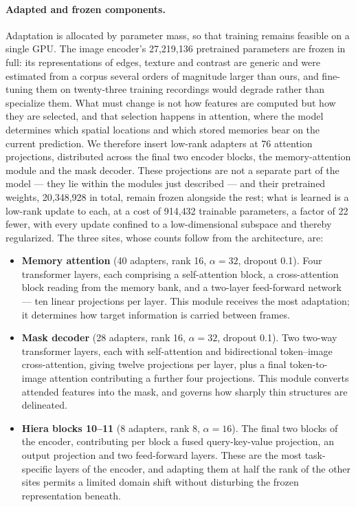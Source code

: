 \documentclass[11pt,a4paper]{article}
\begin{document}
\paragraph{Adapted and frozen components.}
Adaptation is allocated by parameter mass, so that training remains feasible
on a single GPU. The
image encoder's 27{,}219{,}136 pretrained parameters are frozen in full:
its representations of edges, texture and contrast are generic and were
estimated from a corpus several orders of magnitude larger than ours, and
fine-tuning them on twenty-three training recordings would degrade rather
than specialize them.
What must change is not how features are computed but how they are selected,
and that selection happens in attention, where the model determines which
spatial locations and which stored memories bear on the current prediction.
We therefore insert low-rank adapters at 76 attention projections,
distributed across the final two encoder blocks, the memory-attention module
and the mask decoder. These projections are not a separate part of the model
--- they lie within the modules just described --- and their pretrained
weights, 20{,}348{,}928 in total, remain frozen alongside the rest; what is
learned is a low-rank update to each, at a cost of 914{,}432 trainable
parameters, a factor of 22 fewer, with every update confined to a
low-dimensional subspace and thereby regularized. The three sites, whose
counts follow from the architecture, are:

\begin{itemize}\itemsep2pt
  \item \textbf{Memory attention} (40 adapters, rank 16, $\alpha=32$,
        dropout 0.1). Four transformer layers, each comprising a
        self-attention block, a cross-attention block reading from the
        memory bank, and a two-layer feed-forward network --- ten linear
        projections per layer. This module receives the most adaptation; it
        determines how target information is carried between frames.
  \item \textbf{Mask decoder} (28 adapters, rank 16, $\alpha=32$, dropout
        0.1). Two two-way transformer layers, each with self-attention and
        bidirectional token--image cross-attention, giving twelve
        projections per layer, plus a final token-to-image attention
        contributing a further four projections. This module converts
        attended features into the mask, and governs how sharply thin
        structures are delineated.
  \item \textbf{Hiera blocks 10--11} (8 adapters, rank 8, $\alpha=16$).
        The final two blocks of the encoder, contributing per block a fused
        query-key-value projection, an output projection and two
        feed-forward layers. These are the most task-specific layers of the
        encoder, and adapting them at half the rank of the other sites
        permits a limited domain shift without disturbing the frozen
        representation beneath.
\end{itemize}
\end{document}
